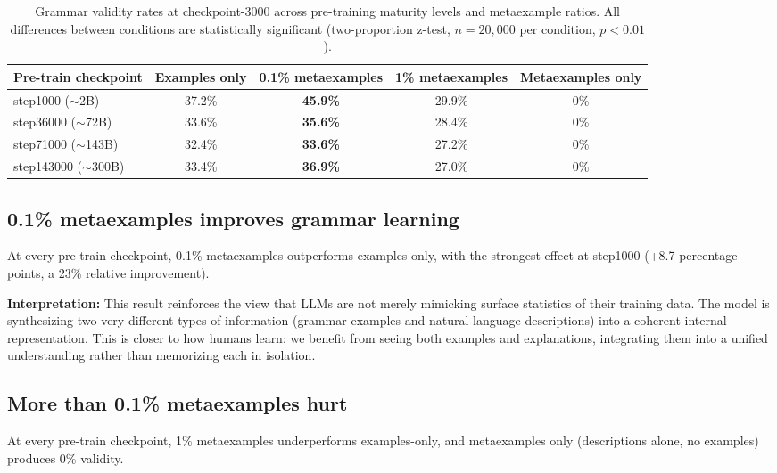 \documentclass[11pt]{article}
\begin{document}
\begin{table}[H]
\centering
\small
\begin{tabular}{lcccc}
\toprule
Pre-train checkpoint & Examples only & 0.1\% metaexamples & 1\% metaexamples & Metaexamples only \\
\midrule
step1000 ({\small${\sim}$2B})     & 37.2\% & \textbf{45.9\%} & 29.9\% & 0\% \\
step36000 ({\small${\sim}$72B})   & 33.6\% & \textbf{35.6\%} & 28.4\% & 0\% \\
step71000 ({\small${\sim}$143B})  & 32.4\% & \textbf{33.6\%} & 27.2\% & 0\% \\
step143000 ({\small${\sim}$300B}) & 33.4\% & \textbf{36.9\%} & 27.0\% & 0\% \\
\bottomrule
\end{tabular}
\caption{Grammar validity rates at checkpoint-3000 across pre-training maturity levels and metaexample ratios. All differences between conditions are statistically significant (two-proportion z-test, $n=20{,}000$ per condition, $p < 0.01$).}
\label{tab:results}
\end{table}

\subsection{0.1\% metaexamples improves grammar learning}

At every pre-train checkpoint, 0.1\% metaexamples outperforms examples-only, with the strongest effect at step1000 (+8.7 percentage points, a 23\% relative improvement).

\textbf{Interpretation:} This result reinforces the view that LLMs are not merely mimicking surface statistics of their training data. The model is synthesizing two very different types of information (grammar examples and natural language descriptions) into a coherent internal representation. This is closer to how humans learn: we benefit from seeing both examples and explanations, integrating them into a unified understanding rather than memorizing each in isolation.

\subsection{More than 0.1\% metaexamples hurt}
\label{sec:too-many}

At every pre-train checkpoint, 1\% metaexamples underperforms examples-only, and metaexamples only (descriptions alone, no examples) produces 0\% validity.
\end{document}
